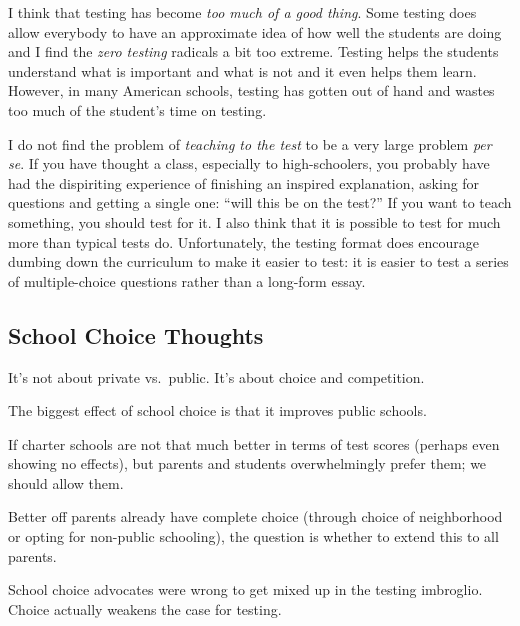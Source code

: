 I think that testing has become \emph{too much of a good thing}. Some testing
does allow everybody to have an approximate idea of how well the students are
doing and I find the \emph{zero testing} radicals a bit too extreme. Testing
helps the students understand what is important and what is not and it even
helps them learn.  However, in many
American schools, testing has gotten out of hand and wastes too much of
the student's time on testing.

I do not find the problem of \emph{teaching to the test} to be a very large
problem \emph{per se}. If you have thought a class, especially to
high-schoolers, you probably have had the dispiriting experience of finishing
an inspired explanation, asking for questions and getting a single one: ``will
this be on the test?'' If you want to teach something, you should test for it.
I also think that it is possible to test for much more than typical tests do.
Unfortunately, the testing format does encourage dumbing down the curriculum to
make it easier to test: it is easier to test a series of multiple-choice
questions rather than a long-form essay.

\subsection{School Choice Thoughts}

\thought It's not about private vs.\ public. It's about choice and competition.

\thought The biggest effect of school choice is that it improves public schools.

\thought If charter schools are not that much better in terms of test scores
(perhaps even showing no effects), but parents and students overwhelmingly
prefer them; we should allow them.

\thought Better off parents already have complete choice (through choice of
neighborhood or opting for non-public schooling), the question is whether to
extend this to all parents.

\thought School choice advocates were wrong to get mixed up in the testing
imbroglio. Choice actually weakens the case for testing.


